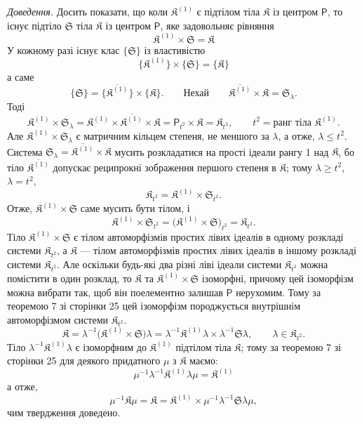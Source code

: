 \documentclass[11pt]{article}
\begin{document}
\emph{Доведення.} Досить показати, що коли \(\mathfrak K^{(1)}\) є підтілом тіла \(\mathfrak K\) із центром \(\mathsf P\), то існує підтіло \(\mathfrak S\) тіла \(\mathfrak K\) із центром \(\mathsf P\), яке задовольняє рівняння
\[
\mathfrak K^{(1)}\times\mathfrak S=\mathfrak K
\]
У кожному разі існує клас \(\{\mathfrak S\}\) із властивістю
\[
\{\mathfrak K^{(1)}\}\times\{\mathfrak S\}=\{\mathfrak K\}
\]
а саме
\[
\{\mathfrak S\}=\{\overline{\mathfrak K^{(1)}}\}\times\{\mathfrak K\}.
\qquad
\text{Нехай}\qquad
\overline{\mathfrak K^{(1)}}\times\mathfrak K=\mathfrak S_\lambda.
\]
Тоді
\[
\mathfrak K^{(1)}\times\mathfrak S_\lambda
=\mathfrak K^{(1)}\times\overline{\mathfrak K^{(1)}}\times\mathfrak K
=\mathsf P_{t^2}\times\mathfrak K
=\mathfrak K_{t^2},
\qquad
t^2=\text{ранг тіла }\mathfrak K^{(1)}.
\]
Але \(\mathfrak K^{(1)}\times\mathfrak S_\lambda\) є матричним кільцем степеня, не меншого за \(\lambda\), а отже, \(\lambda\leq t^2\). Система \(\mathfrak S_\lambda=\overline{\mathfrak K^{(1)}}\times\mathfrak K\) мусить розкладатися на прості ідеали рангу 1 над \(\mathfrak K\), бо тіло \(\overline{\mathfrak K^{(1)}}\) допускає реципрокні зображення першого степеня в \(\mathfrak K\); тому \(\lambda\geq t^2\), \(\lambda=t^2\),
\[
\mathfrak K_{t^2}=\mathfrak K^{(1)}\times\mathfrak S_{t^2}.
\]
Отже, \(\mathfrak K^{(1)}\times\mathfrak S\) саме мусить бути тілом, і
\[
\mathfrak K^{(1)}\times\mathfrak S_{t^2}
=\bigl(\mathfrak K^{(1)}\times\mathfrak S\bigr)_{t^2}
=\mathfrak K_{t^2}.
\]
Тіло \(\mathfrak K^{(1)}\times\mathfrak S\) є тілом автоморфізмів простих лівих ідеалів в одному розкладі системи \(\mathfrak K_{t^2}\), а \(\mathfrak K\) --- тілом автоморфізмів простих лівих ідеалів в іншому розкладі системи \(\mathfrak K_{t^2}\). Але оскільки будь-які два різні ліві ідеали системи \(\mathfrak K_{t^2}\) можна помістити в один розклад, то \(\mathfrak K\) та \(\mathfrak K^{(1)}\times\mathfrak S\) ізоморфні, причому цей ізоморфізм можна вибрати так, щоб він поелементно залишав \(\mathsf P\) нерухомим. Тому за теоремою 7 зі сторінки 25 цей ізоморфізм породжується внутрішнім автоморфізмом системи \(\mathfrak K_{t^2}\).
\[
\mathfrak K
=\lambda^{-1}\bigl(\mathfrak K^{(1)}\times\mathfrak S\bigr)\lambda
=\lambda^{-1}\mathfrak K^{(1)}\lambda\times\lambda^{-1}\mathfrak S\lambda,
\qquad
\lambda\in\mathfrak K_{t^2}.
\]
Тіло \(\lambda^{-1}\mathfrak K^{(1)}\lambda\) є ізоморфним до \(\mathfrak K^{(1)}\) підтілом тіла \(\mathfrak K\); тому за теоремою 7 зі сторінки 25 для деякого придатного \(\mu\) з \(\mathfrak K\) маємо:
\[
\mu^{-1}\lambda^{-1}\mathfrak K^{(1)}\lambda\mu=\mathfrak K^{(1)}
\]
а отже,
\[
\mu^{-1}\mathfrak K\mu
=\mathfrak K
=\mathfrak K^{(1)}\times\mu^{-1}\lambda^{-1}\mathfrak S\lambda\mu,
\]
чим твердження доведено.
\end{document}
